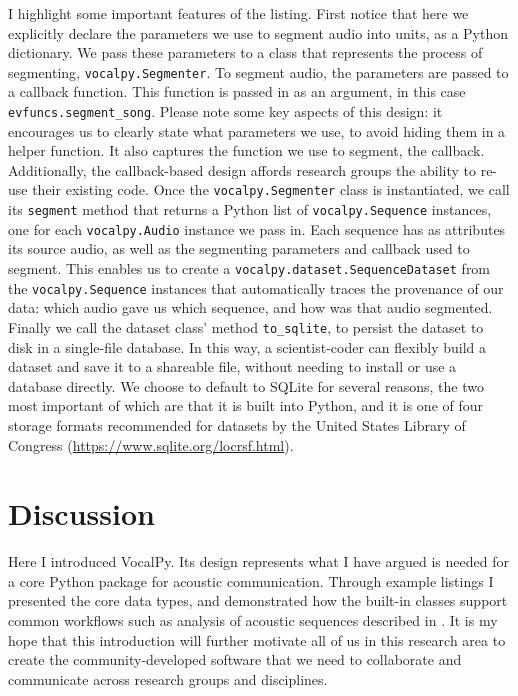 \documentclass[11pt]{article}
\begin{document}
I highlight some important features of the listing. First notice that here we explicitly declare the parameters we use to segment audio into units, as a Python dictionary. We pass these parameters to a class that represents the process of segmenting, \texttt{vocalpy.Segmenter}. To segment audio, the parameters are passed to a callback function. This function is passed in as an argument, in this case \texttt{evfuncs.segment\_song}. Please note some key aspects of this design: it encourages us to clearly state what parameters we use, to avoid hiding them in a helper function. It also captures the function we use to segment, the callback. Additionally, the callback-based design affords research groups the ability to re-use their existing code. Once the \texttt{vocalpy.Segmenter} class is instantiated, we call its \texttt{segment} method that returns a Python list of \texttt{vocalpy.Sequence} instances, one for each \texttt{vocalpy.Audio} instance we pass in. Each sequence has as attributes its source audio, as well as the segmenting parameters and callback used to segment. This enables us to create a \texttt{vocalpy.dataset.SequenceDataset} from the \texttt{vocalpy.Sequence} instances that automatically traces the provenance of our data: which audio gave us which sequence, and how was that audio segmented. Finally we call the dataset class' method \texttt{to\_sqlite}, to persist the dataset to disk in a single-file database. In this way, a scientist-coder can flexibly build a dataset and save it to a shareable file, without needing to install or use a database directly. We choose to default to SQLite for several reasons, the two most important of which are that it is built into Python, and it is one of four storage formats recommended for datasets by the United States Library of Congress (\url{https://www.sqlite.org/locrsf.html}).

\section{Discussion}

Here I introduced VocalPy. Its design represents what I have argued is needed for a core Python package for acoustic communication. Through example listings I presented the core data types, and demonstrated how the built-in classes support common workflows such as analysis of acoustic sequences described in \cite{kershenbaumAcousticSequencesNonhuman2016}. It is my hope that this introduction will further motivate all of us in this research area to create the community-developed software that we need to collaborate and communicate across research groups and disciplines.


\end{document}
